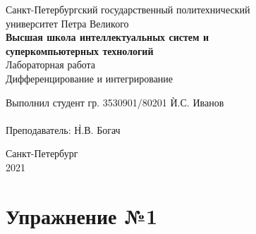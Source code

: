 \documentclass[a4paper, 14pt]{extarticle}
\begin{document}
    \begin{center}
        \begin{center}
            \hfill \break
            \normalsize{Санкт-Петербургский государственный политехнический}\\
            \normalsize{университет Петра Великого}\\
            \hfill \break
            \normalsize{\textbf{Высшая школа интеллектуальных систем и}}\\
            \normalsize{\textbf{суперкомпьютерных технологий}}\\
            \hfill \break
            \hfill \break
            \hfill \break
            \normalsize{Лабораторная работа}\\
            \hfill \break
            \normalsize{\LARGE Дифференцирование и интегрирование}\\
        \end{center}
        \hfill \break
        \hfill \break
        \hfill \break
        \hfill \break
        \hfill \break
        \hfill \break
        \hfill \break
        \hfill \break
        \hfill \break
        \hfill \break
        \begin{tabbing}
            Выполнил студент гр. 3530901/80201 \`И.С. Иванов\\
            \\
            Преподаватель: \`Н.В. Богач\\
        \end{tabbing}
        \hfill \break
        \hfill \break
        \hfill \break
        \hfill \break
        \begin{center}
            Санкт-Петербург\\
            2021
        \end{center}
        \thispagestyle{empty}
    \end{center}

    \newpage
    \tableofcontents

    \newpage
    \listoffigures

    \newpage
    \lstlistoflistings

    \newpage


    \section{Упражнение №1}
    \label{sec:1}
\end{document}
